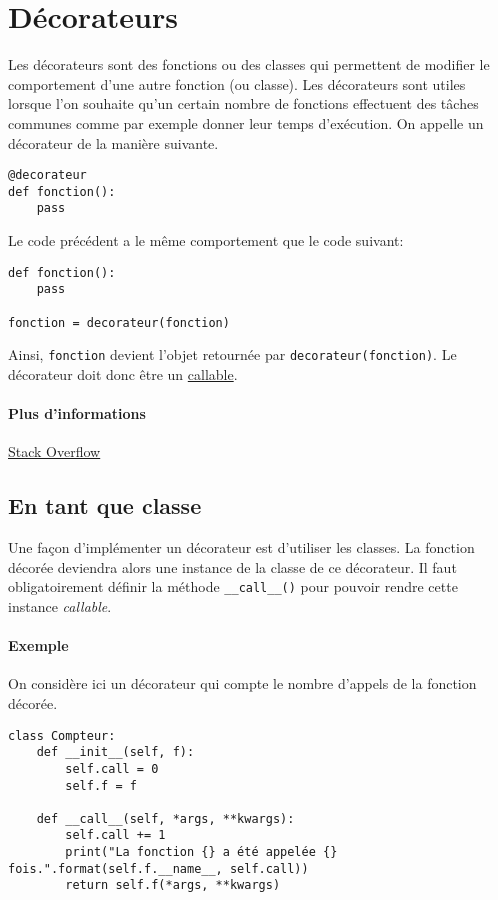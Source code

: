 \section{Décorateurs}\label{sec:decorateur}
Les décorateurs sont des fonctions ou des classes qui permettent de modifier le comportement d'une autre fonction (ou classe). Les décorateurs sont utiles lorsque l'on souhaite qu'un certain nombre de fonctions effectuent des tâches communes comme par exemple donner leur temps d'exécution. On appelle un décorateur de la manière suivante.

\begin{verbatim}
@decorateur
def fonction():
    pass
\end{verbatim}

Le code précédent a le même comportement que le code suivant:

\begin{verbatim}
def fonction():
    pass

fonction = decorateur(fonction)
\end{verbatim}

Ainsi, \texttt{fonction} devient l'objet retournée par \texttt{decorateur(fonction)}. Le décorateur doit donc être un \hyperref[sec:callable]{callable}.

\paragraph{Plus d'informations} \href{https://stackoverflow.com/questions/739654/how-to-make-a-chain-of-function-decorators/1594484#1594484}{Stack Overflow}

\subsection{En tant que classe}
Une façon d'implémenter un décorateur est d'utiliser les classes. La fonction décorée deviendra alors une instance de la classe de ce décorateur. Il faut obligatoirement définir la méthode \texttt{__call__()} pour pouvoir rendre cette instance \emph{callable}.

\paragraph{Exemple} On considère ici un décorateur qui compte le nombre d'appels de la fonction décorée.
\begin{verbatim}
class Compteur:
    def __init__(self, f):
        self.call = 0
        self.f = f

    def __call__(self, *args, **kwargs):
        self.call += 1
        print("La fonction {} a été appelée {} fois.".format(self.f.__name__, self.call))
        return self.f(*args, **kwargs)
\end{verbatim}


